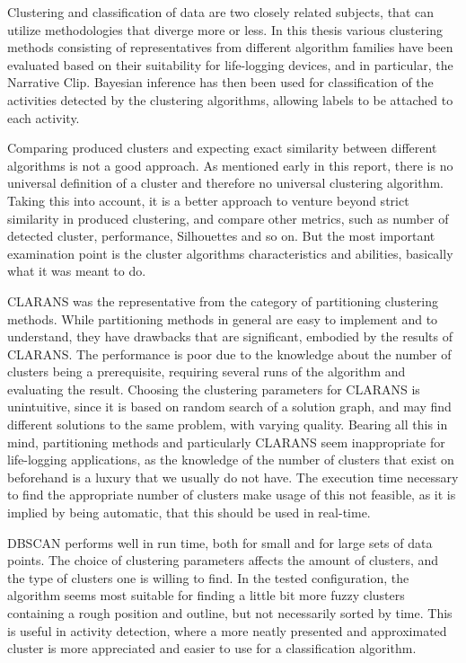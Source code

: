 Clustering and classification of data are two closely related subjects, 
that can utilize methodologies that diverge more or less. In this thesis 
various clustering methods consisting of representatives from different
algorithm families have been evaluated based on their suitability for 
life-logging devices, and in particular, the Narrative Clip. Bayesian 
inference has then been used for classification of the activities detected 
by the clustering algorithms, allowing labels to be attached to each 
activity. 

Comparing produced clusters and expecting exact similarity between different
algorithms is not a good approach. As mentioned early in this report, 
there is no universal definition of a cluster and therefore no universal 
clustering algorithm. Taking this into account, it is a better approach to
venture beyond strict similarity in produced clustering, and compare other 
metrics, such as number of detected cluster, performance, Silhouettes and so
on. But the most important examination point is the cluster algorithms 
characteristics and abilities, basically what it was meant to do.

CLARANS was the representative from the category of partitioning clustering 
methods. While partitioning methods in general are easy to implement and to 
understand, they have drawbacks that are significant, embodied by the results 
of CLARANS. The performance is poor due to the knowledge about the number of 
clusters being a prerequisite, requiring several runs of the algorithm and 
evaluating the result. Choosing the clustering parameters for CLARANS is 
unintuitive, since it is based on random search of a solution graph, and may 
find different solutions to the same problem, with varying quality. Bearing 
all this in mind, partitioning methods and particularly CLARANS seem 
inappropriate for life-logging applications, as the knowledge of the number
of clusters that exist on beforehand is a luxury that we usually do not have.
The execution time necessary to find the appropriate number of clusters
make usage of this not feasible, as it is implied by being automatic, that
this should be used in real-time.

DBSCAN performs well in run time, both for small and for large sets of data 
points. The choice of clustering parameters affects the amount of clusters, 
and the type of clusters one is willing to find. In the tested configuration, 
the algorithm seems most suitable for finding a little bit more fuzzy clusters
containing a rough position and outline, but not necessarily sorted by time. 
This is useful in activity detection, where a more neatly presented and 
approximated cluster is more appreciated and easier to use for a 
classification algorithm.

